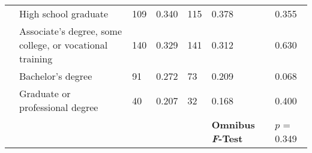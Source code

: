\begin{tabular}{L{3cm} L{5cm} C{1.5cm} C{2.5cm} C{1.5cm} C{2.5cm} C{3cm}}
                                                          &                   High school graduate                   &                           109                            &                          0.340                           &                           115                            &                          0.378                           &                          0.355                            \\
                                                          & Associate's degree, some college, or vocational training &                           140                            &                          0.329                           &                           141                            &                          0.312                           &                          0.630                            \\
                                                          &                    Bachelor's degree                     &                            91                            &                          0.272                           &                            73                            &                          0.209                           &                          0.068                            \\
                                                          &             Graduate or professional degree              &                            40                            &                          0.207                           &                            32                            &                          0.168                           &                          0.400                            \\
\hline
                                                          &                                                          &                                                          &                                                          &                                                          &\textbf{Omnibus \textit{F}-Test}                          &                       $p$ = 0.349                         \\
\hline
\end{tabular}
